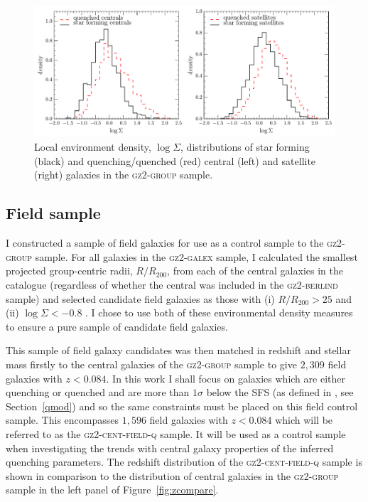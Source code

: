 \begin{figure}
\centering
\includegraphics[width=\textwidth]{environment/SIGMA_density_sf_q_cent_sat.pdf}
\caption[Local environment density distributions of central and satellite galaxies]{Local environment density, $\log\Sigma$, distributions of star forming (black) and quenching/quenched (red) central (left) and satellite (right) galaxies in the \textsc{gz2-group} sample.}
\label{fig:sigmadist}
\end{figure}


\subsection{Field sample}\label{sec:field}

I constructed a sample of field galaxies for use as a control sample to the \textsc{gz2-group} sample. For all galaxies in the \textsc{gz2-galex} sample, I calculated the smallest projected group-centric radii, $R/R_{200}$, from each of the central galaxies in the \citet{berlind06} catalogue (regardless of whether the central was included in the \textsc{gz2-berlind} sample) and selected candidate field galaxies as those with (i) $R/R_{200} > 25$ and (ii) $\log\Sigma < -0.8$ \citep[the threshold on the local environment density which selects field galaxies as defined by][]{Baldry06}. I chose to use both of these environmental density measures to ensure a pure sample of candidate field galaxies.

This sample of field galaxy candidates was then matched in redshift and stellar mass firstly to the central galaxies of the \textsc{gz2-group} sample to give $2,309$ field galaxies with $z < 0.084$. In this work I shall focus on galaxies which are either quenching or quenched and are more than $1\sigma$ below the SFS (as defined in \citet{peng10}, see Section~\ref{qmod}) and so the same constraints must be placed on this field control sample. This encompasses $1,596$ field galaxies with $z < 0.084$ which will be referred to as the \textsc{gz2-cent-field-q} sample. It will be used as a control sample when investigating the trends with central galaxy properties of the inferred quenching parameters. The redshift distribution of the \textsc{gz2-cent-field-q} sample is shown in comparison to the distribution of central galaxies in the \textsc{gz2-group} sample in the left panel of Figure~\ref{fig:zcompare}. %

